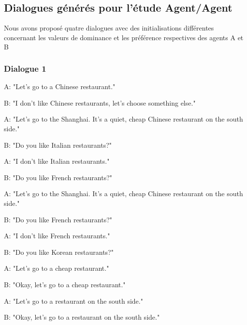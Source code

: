 \begin{appendix}

\chapter{Dialogues générés pour l'étude Agent/Agent}
\label{annexe:crowd}
	Nous avons proposé quatre dialogues avec des initialisations différentes concernant les valeurs de dominance et les préférence respectives des agents A et B
	
	\subsection{Dialogue 1}
		\begin{minipage}{\textwidth}
			{\ttfamily
				\begin{addmargin}[1em]{2em}%
					A: "Let's go to a Chinese restaurant."
					
					\hspace*{3mm}B: "I don't like Chinese restaurants, let's choose something else."
					
					A: "Let's go to the Shanghai. It's a quiet, cheap Chinese restaurant on the south side."
					
					\hspace*{3mm}B: "Do you like Italian restaurants?"
					
					A: "I don't like Italian restaurants."
					
					\hspace*{3mm}B: "Do you like French restaurants?"
					
					A: "Let's go to the Shanghai. It's a quiet, cheap Chinese restaurant on the south side."
					
					\hspace*{3mm}B: "Do you like French restaurants?"
					
					A: "I don't like French restaurants."
					
					\hspace*{3mm}B: "Do you like Korean restaurants?"
					
					A: "Let's go to a cheap restaurant."
					
					\hspace*{3mm}B: "Okay, let's go to a cheap restaurant."
					
					A: "Let's go to a restaurant on the south side."
					
					\hspace*{3mm}B: "Okay, let's go to a restaurant on the south side."
					

\end{addmargin}}
\end{minipage}
\end{appendix}
